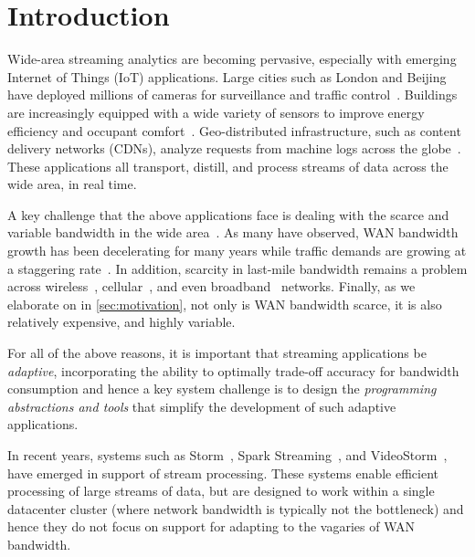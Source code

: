 \section{Introduction}

Wide-area streaming analytics are becoming pervasive, especially with emerging
Internet of Things (IoT) applications. Large cities such as London and Beijing
have deployed millions of cameras for surveillance and traffic
control~\cite{skynet, london.surveillance}. Buildings are increasingly equipped
with a wide variety of sensors to improve energy efficiency and occupant
comfort~\cite{krioukov2012building}. Geo-distributed infrastructure, such as
content delivery networks (CDNs), analyze requests from machine logs across the
globe~\cite{mukerjee2015practical}. These applications all transport, distill,
and process streams of data across the wide area, in real time.

A key challenge that the above applications face is dealing with the scarce and
variable bandwidth in the wide area~\cite{hsieh17gaia, vulimiri2015global}.  As
many have observed, WAN bandwidth growth has been decelerating for many years
while traffic demands are growing at a staggering
rate~\cite{global2016telegeography, cisco2013zettabyte, cisco2016global}.  In
addition, scarcity in last-mile bandwidth remains a problem across
wireless~\cite{biswas2015large}, cellular~\cite{nikravesh2014mobile}, and even
broadband~\cite{grover2013peeking, sundaresan2014bismark} networks.  Finally, as
we elaborate on in \autoref{sec:motivation}, not only is WAN bandwidth scarce,
it is also relatively expensive, and highly variable.

For all of the above reasons, it is important that streaming applications be
\emph{adaptive}, incorporating the ability to optimally trade-off accuracy for
bandwidth consumption and hence a key system challenge is to design the
\emph{programming abstractions and tools} that simplify the development of such
adaptive applications.

In recent years, systems such as Storm~\cite{toshniwal2014storm}, Spark
Streaming~\cite{zaharia2013discretized}, and VideoStorm~\cite{zhang2017live},
have emerged in support of stream processing.  These systems enable efficient
processing of large streams of data, but are designed to work within a single
datacenter cluster (where network bandwidth is typically not the bottleneck) and
hence they do not focus on support for adapting to the vagaries of WAN
bandwidth.

